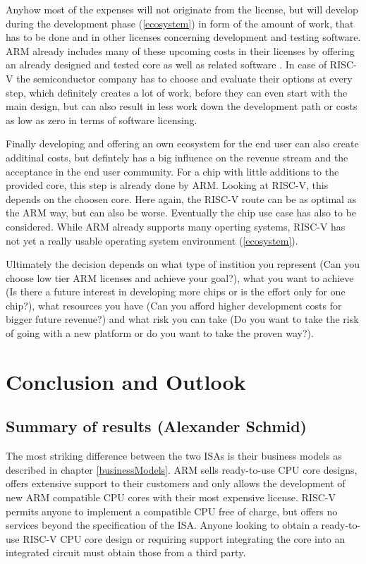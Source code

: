 \documentclass[conference]{IEEEtran}
\begin{document}
	Anyhow most of the expenses will not originate from the license, but will develop during the development phase (\ref{ecosystem}) in form of the amount of work, that has to be done and in other licenses concerning development and testing software. ARM already includes many of these upcoming costs in their licenses by offering an already designed and tested core as well as related software \cite{ARM2019}. In case of RISC-V the semiconductor company has to choose and evaluate their options at every step, which definitely creates a lot of work, before they can even start with the main design, but can also result in less work down the development path or costs as low as zero in terms of software licensing.

	Finally developing and offering an own ecosystem for the end user can also create additinal costs, but defintely has a big influence on the revenue stream and the acceptance in the end user community. For a chip with little additions to the provided core, this step is already done by ARM. Looking at RISC-V, this depends on the choosen core. Here again, the RISC-V route can be as optimal as the ARM way, but can also be worse. Eventually the chip use case has also to be considered. While ARM already supports many operting systems, RISC-V has not yet a really usable operating system environment (\ref{ecosystem}).

	Ultimately the decision depends on what type of instition you represent (Can you choose low tier ARM licenses 
	and achieve your goal?), what you want to achieve (Is there a future interest in developing more chips or is the effort only for one chip?), what resources you have (Can you afford higher development costs for bigger future revenue?) and what risk you can take (Do you want to take the risk of going with a new platform or do you want to take the proven way?).


\section{Conclusion and Outlook}
\label{ref:conclusion}
	\subsection{Summary of results (Alexander Schmid)}
	The most striking difference between the two \glspl{ISA} is their business models as described in chapter \ref{businessModels}.
	ARM sells ready-to-use \gls{CPU} core designs, offers extensive support to their customers and only allows the development of new
	ARM compatible \gls{CPU} cores with their most expensive license.
	RISC-V permits anyone to implement a compatible \gls{CPU} free of charge, but offers no services beyond the specification of the \gls{ISA}.
	Anyone looking to obtain a ready-to-use RISC-V \gls{CPU} core design or requiring support integrating the core into an integrated circuit
	must obtain those from a third party.
\end{document}
